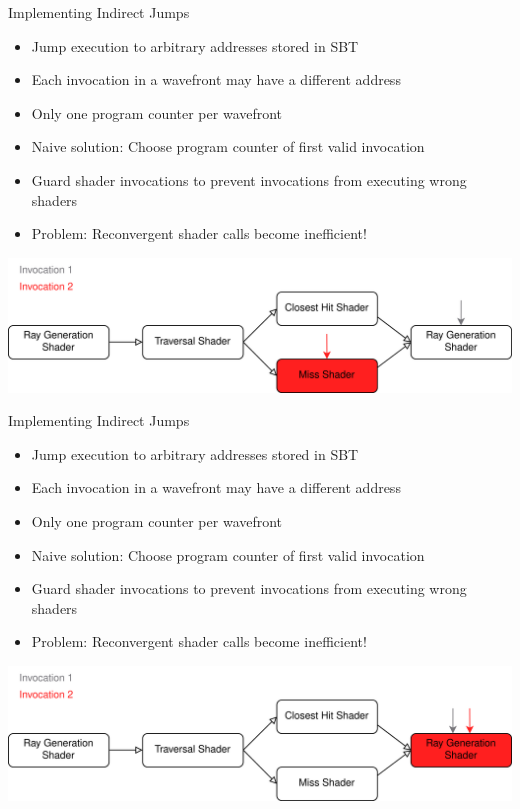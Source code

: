 \documentclass[aspectratio=169,t]{beamer}
\begin{document}
\begin{slide}{Implementing Indirect Jumps}
 \begin{itemize}
  \item Jump execution to arbitrary addresses stored in SBT
  \item Each invocation in a wavefront may have a different address
  \item Only one program counter per wavefront
  \item Naive solution: Choose program counter of first valid invocation
  \item Guard shader invocations to prevent invocations from executing wrong shaders
  \item Problem: Reconvergent shader calls become inefficient!
 \end{itemize}
 \includegraphics[width=\textwidth]{graphics/RTStages2-5.png}
\end{slide}

\begin{slide}{Implementing Indirect Jumps}
 \begin{itemize}
  \item Jump execution to arbitrary addresses stored in SBT
  \item Each invocation in a wavefront may have a different address
  \item Only one program counter per wavefront
  \item Naive solution: Choose program counter of first valid invocation
  \item Guard shader invocations to prevent invocations from executing wrong shaders
  \item Problem: Reconvergent shader calls become inefficient!
 \end{itemize}
 \includegraphics[width=\textwidth]{graphics/RTStages2-6.png}
\end{slide}
\end{document}

